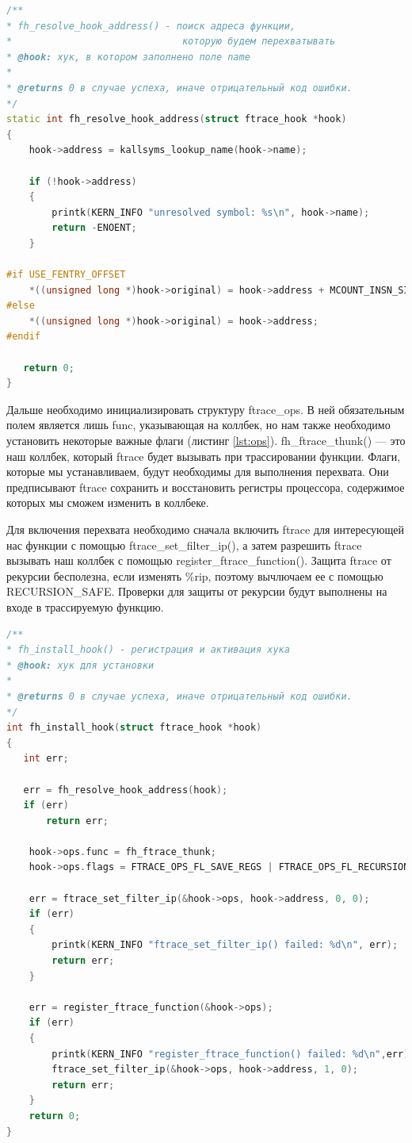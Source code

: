 \documentclass[a4paper,14pt]{article}
\begin{document}
\begin{lstlisting}[language=C++,label={lst:resolve}, caption=\text{Поиск адреса функции по ее имени.}]
/**
* fh_resolve_hook_address() - поиск адреса функции, 
* 							   которую будем перехватывать
* @hook: хук, в котором заполнено поле name
*
* @returns 0 в случае успеха, иначе отрицательный код ошибки.
*/
static int fh_resolve_hook_address(struct ftrace_hook *hook)
{
	hook->address = kallsyms_lookup_name(hook->name);
  
	if (!hook->address)
    {
		printk(KERN_INFO "unresolved symbol: %s\n", hook->name);
		return -ENOENT;
    }
  
#if USE_FENTRY_OFFSET
   	*((unsigned long *)hook->original) = hook->address + MCOUNT_INSN_SIZE;
#else
	*((unsigned long *)hook->original) = hook->address;
#endif
   
   return 0;
}
\end{lstlisting}

Дальше необходимо инициализировать структуру ftrace\_ops. В ней обязательным
полем является лишь func, указывающая на коллбек, но нам также необходимо
установить некоторые важные флаги (листинг \ref{lst:ops}). fh\_ftrace\_thunk() — это наш коллбек, который ftrace будет вызывать при трассировании функции. Флаги, которые мы устанавливаем, будут необходимы для выполнения перехвата. Они предписывают ftrace сохранить и восстановить регистры процессора, содержимое которых мы сможем изменить в коллбеке.

Для включения перехвата необходимо сначала включить ftrace для интересующей нас функции с помощью ftrace\_set\_filter\_ip(), а затем разрешить ftrace вызывать наш коллбек с помощью register\_ftrace\_function(). Защита ftrace от рекурсии бесполезна, если изменять \%rip, поэтому вычлючаем ее с помощью RECURSION\_SAFE. Проверки для защиты от рекурсии будут выполнены на входе в трассируемую функцию.


\begin{lstlisting}[language=C++,label={lst:ops}, caption=\text{Инициализация структуры ftrace\_ops.}]
/**
* fh_install_hook() - регистрация и активация хука
* @hook: хук для установки
*
* @returns 0 в случае успеха, иначе отрицательный код ошибки.
*/
int fh_install_hook(struct ftrace_hook *hook)
{
   int err;
   
   err = fh_resolve_hook_address(hook);
   if (err)
	   return err;

    hook->ops.func = fh_ftrace_thunk;
    hook->ops.flags = FTRACE_OPS_FL_SAVE_REGS | FTRACE_OPS_FL_RECURSION_SAFE | FTRACE_OPS_FL_IPMODIFY;

    err = ftrace_set_filter_ip(&hook->ops, hook->address, 0, 0);
    if (err)
    {
	    printk(KERN_INFO "ftrace_set_filter_ip() failed: %d\n", err);
	    return err;
    }

    err = register_ftrace_function(&hook->ops);
    if (err)
    {
	    printk(KERN_INFO "register_ftrace_function() failed: %d\n",err);
	    ftrace_set_filter_ip(&hook->ops, hook->address, 1, 0);
	    return err;
    }
    return 0;
}
\end{lstlisting}
\end{document}

